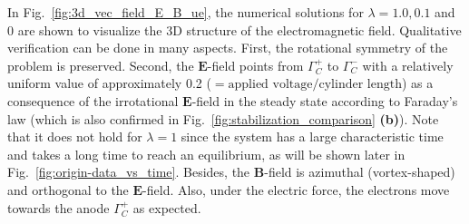 \documentclass{article}
\begin{document}
In Fig.~\ref{fig:3d_vec_field_E_B_ue}, the numerical solutions for $\lambda = 1.0, 0.1$
and $0$ are shown to visualize the 3D structure of the electromagnetic field. Qualitative
verification can be done in many aspects. First, the rotational symmetry of the problem is
preserved. Second, the $\mathbf{E}$-field points from $\Gamma^+_C$ to $\Gamma^-_C$ with a
relatively uniform value of approximately 0.2
($=\text{applied voltage}/\text{cylinder length}$) as a consequence of the irrotational
$\mathbf{E}$-field in the steady state according to Faraday's law (which is also confirmed
in Fig.~\ref{fig:stabilization_comparison} \textbf{(b)}). Note that it does not hold for $\lambda = 1$
since the system has a large characteristic time and takes a long time to reach an
equilibrium, as will be shown later in Fig.~\ref{fig:origin-data_vs_time}. Besides, the
$\mathbf{B}$-field is azimuthal (vortex-shaped) and orthogonal to the
$\mathbf{E}$-field. Also, under the electric force, the electrons move towards the anode
$\Gamma^+_C$ as expected.
\end{document}
